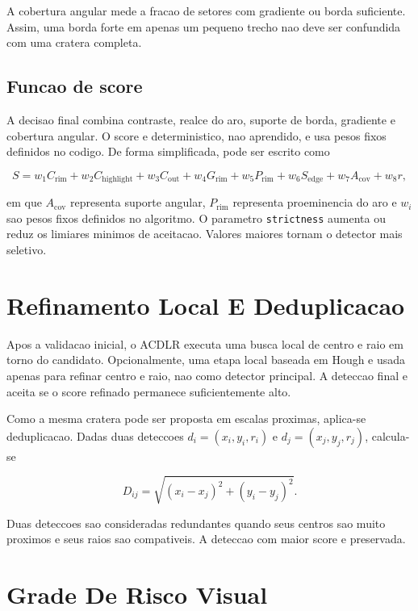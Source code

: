 \documentclass[12pt,a4paper]{article}
\begin{document}
A cobertura angular mede a fracao de setores com gradiente ou borda suficiente. Assim, uma borda forte em apenas um pequeno trecho nao deve ser confundida com uma cratera completa.

\subsection{Funcao de score}

A decisao final combina contraste, realce do aro, suporte de borda, gradiente e cobertura angular. O score e deterministico, nao aprendido, e usa pesos fixos definidos no codigo. De forma simplificada, pode ser escrito como

\begin{equation}
S = 
w_1 C_{\text{rim}} +
w_2 C_{\text{highlight}} +
w_3 C_{\text{out}} +
w_4 G_{\text{rim}} +
w_5 P_{\text{rim}} +
w_6 S_{\text{edge}} +
w_7 A_{\text{cov}} +
w_8 r,
\end{equation}

em que $A_{\text{cov}}$ representa suporte angular, $P_{\text{rim}}$ representa proeminencia do aro e $w_i$ sao pesos fixos definidos no algoritmo. O parametro \texttt{strictness} aumenta ou reduz os limiares minimos de aceitacao. Valores maiores tornam o detector mais seletivo.

\section{Refinamento Local E Deduplicacao}

Apos a validacao inicial, o ACDLR executa uma busca local de centro e raio em torno do candidato. Opcionalmente, uma etapa local baseada em Hough e usada apenas para refinar centro e raio, nao como detector principal. A deteccao final e aceita se o score refinado permanece suficientemente alto.

Como a mesma cratera pode ser proposta em escalas proximas, aplica-se deduplicacao. Dadas duas deteccoes $d_i=(x_i,y_i,r_i)$ e $d_j=(x_j,y_j,r_j)$, calcula-se

\begin{equation}
D_{ij} = \sqrt{(x_i-x_j)^2 + (y_i-y_j)^2}.
\end{equation}

Duas deteccoes sao consideradas redundantes quando seus centros sao muito proximos e seus raios sao compativeis. A deteccao com maior score e preservada.

\section{Grade De Risco Visual}
\end{document}

